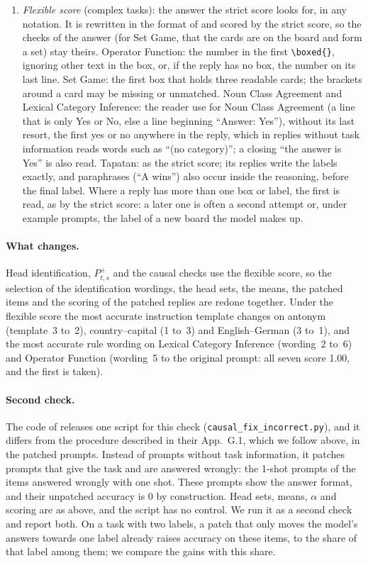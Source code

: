 \documentclass[11pt,a4paper]{article}
\begin{document}
\begin{enumerate}
\item \emph{Flexible score} (complex tasks): the answer the strict score looks for, in any notation. It is rewritten in the format of \citet{fu2026rules} and scored by the strict score, so the checks of the answer (for Set Game, that the cards are on the board and form a set) stay theirs. Operator Function: the number in the first \texttt{\textbackslash boxed\{\}}, ignoring other text in the box, or, if the reply has no box, the number on its last line. Set Game: the first box that holds three readable cards; the brackets around a card may be missing or unmatched. Noun Class Agreement and Lexical Category Inference: the reader \citet{fu2026rules} use for Noun Class Agreement (a line that is only Yes or No, else a line beginning ``Answer: Yes''), without its last resort, the first yes or no anywhere in the reply, which in replies without task information reads words such as ``(no category)''; a closing ``the answer is Yes'' is also read. Tapatan: as the strict score; its replies write the labels exactly, and paraphrases (``A wins'') also occur inside the reasoning, before the final label. Where a reply has more than one box or label, the first is read, as by the strict score: a later one is often a second attempt or, under example prompts, the label of a new board the model makes up.
\end{enumerate}
\paragraph{What changes.} Head identification, $P^{+}_{t,s}$ and the causal checks use the flexible score, so the selection of the identification wordings, the head sets, the means, the patched items and the scoring of the patched replies are redone together. Under the flexible score the most accurate instruction template changes on antonym (template~3 to~2), country--capital (1 to~3) and English--German (3 to~1), and the most accurate rule wording on Lexical Category Inference (wording~2 to~6) and Operator Function (wording~5 to the original prompt: all seven score 1.00, and the first is taken).

\paragraph{Second check.} The code of \citet{yang2026shared} releases one script for this check (\texttt{causal\_fix\_incorrect.py}), and it differs from the procedure described in their App.~G.1, which we follow above, in the patched prompts. Instead of prompts without task information, it patches prompts that give the task and are answered wrongly: the 1-shot prompts of the items answered wrongly with one shot. These prompts show the answer format, and their unpatched accuracy is 0 by construction. Head sets, means, $\alpha$ and scoring are as above, and the script has no control. We run it as a second check and report both. On a task with two labels, a patch that only moves the model's answers towards one label already raises accuracy on these items, to the share of that label among them; we compare the gains with this share.
\end{document}
